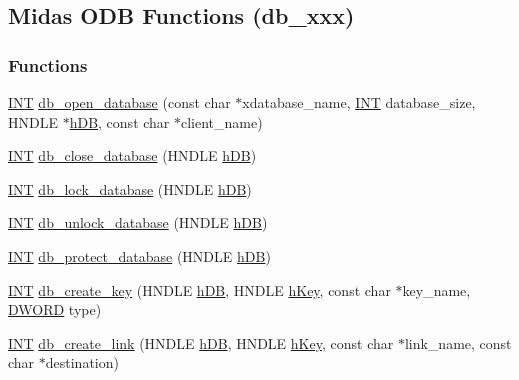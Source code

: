 \subsection{Midas ODB Functions (db\_\-xxx)}
\label{group__odbfunctionc}
\subsubsection*{Functions}
\begin{DoxyCompactItemize}
\item 
\hyperlink{vppg_8h_a392e62da233ed3e2f7c3fd4f487a3896}{INT} \hyperlink{group__odbfunctionc_gaece9851974b00231428f82b341e2c523}{db\_\-open\_\-database} (const char $\ast$xdatabase\_\-name, \hyperlink{vppg_8h_a392e62da233ed3e2f7c3fd4f487a3896}{INT} database\_\-size, HNDLE $\ast$\hyperlink{mevb_8c_ab1f60c53f74e806a3b9f687af38d7421}{hDB}, const char $\ast$client\_\-name)
\item 
\hyperlink{vppg_8h_a392e62da233ed3e2f7c3fd4f487a3896}{INT} \hyperlink{group__odbfunctionc_gadbb92e13899bbffc584b676bb924586e}{db\_\-close\_\-database} (HNDLE \hyperlink{mevb_8c_ab1f60c53f74e806a3b9f687af38d7421}{hDB})
\item 
\hyperlink{vppg_8h_a392e62da233ed3e2f7c3fd4f487a3896}{INT} \hyperlink{group__odbfunctionc_ga299048aeed427690630027aa5aebc451}{db\_\-lock\_\-database} (HNDLE \hyperlink{mevb_8c_ab1f60c53f74e806a3b9f687af38d7421}{hDB})
\item 
\hyperlink{vppg_8h_a392e62da233ed3e2f7c3fd4f487a3896}{INT} \hyperlink{group__odbfunctionc_ga52885112dd8f2acc551ac0610d7f552d}{db\_\-unlock\_\-database} (HNDLE \hyperlink{mevb_8c_ab1f60c53f74e806a3b9f687af38d7421}{hDB})
\item 
\hyperlink{vppg_8h_a392e62da233ed3e2f7c3fd4f487a3896}{INT} \hyperlink{group__odbfunctionc_ga959637b6837f613af5a8a3df52af6f3b}{db\_\-protect\_\-database} (HNDLE \hyperlink{mevb_8c_ab1f60c53f74e806a3b9f687af38d7421}{hDB})
\item 
\hyperlink{vppg_8h_a392e62da233ed3e2f7c3fd4f487a3896}{INT} \hyperlink{group__odbfunctionc_ga4dcab15e47980882e35bddf3ceb9aee5}{db\_\-create\_\-key} (HNDLE \hyperlink{mevb_8c_ab1f60c53f74e806a3b9f687af38d7421}{hDB}, HNDLE \hyperlink{mevb_8c_a8cd567d23219ba7fc83280cf20caf1c2}{hKey}, const char $\ast$key\_\-name, \hyperlink{vt2_8h_a798af1e30bc65f319c1a246cecf59e39}{DWORD} type)
\item 
\hyperlink{vppg_8h_a392e62da233ed3e2f7c3fd4f487a3896}{INT} \hyperlink{group__odbfunctionc_ga3da25029b1835ef605483b91684704f6}{db\_\-create\_\-link} (HNDLE \hyperlink{mevb_8c_ab1f60c53f74e806a3b9f687af38d7421}{hDB}, HNDLE \hyperlink{mevb_8c_a8cd567d23219ba7fc83280cf20caf1c2}{hKey}, const char $\ast$link\_\-name, const char $\ast$destination)

\end{DoxyCompactItemize}
